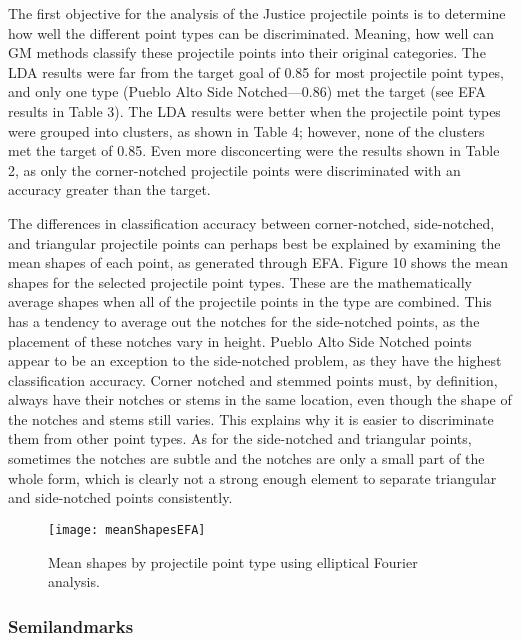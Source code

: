 \documentclass[PCJ,Unicode,screen,mode=plain]{cedram}
\begin{document}
The first objective for the analysis of the Justice projectile points is to determine how well the different point types can be discriminated. Meaning, how well can GM methods classify these projectile points into their original categories. The LDA results were far from the target goal of 0.85 for most projectile point types, and only one type (Pueblo Alto Side Notched---0.86) met the target (see EFA results in Table 3). The LDA results were better when the projectile point types were grouped into clusters, as shown in Table 4; however, none of the clusters met the target of 0.85. Even more disconcerting were the results shown in Table 2, as only the corner-notched projectile points were discriminated with an accuracy greater than the target.

The differences in classification accuracy between corner-notched, side-notched, and triangular projectile points can perhaps best be explained by examining the mean shapes of each point, as generated through EFA. Figure 10 shows the mean shapes for the selected projectile point types. These are the mathematically average shapes when all of the projectile points in the type are combined. This has a tendency to average out the notches for the side-notched points, as the placement of these notches vary in height. Pueblo Alto Side Notched points appear to be an exception to the side-notched problem, as they have the highest classification accuracy. Corner notched and stemmed points must, by definition, always have their notches or stems in the same location, even though the shape of the notches and stems still varies. This explains why it is easier to discriminate them from other point types. As for the side-notched and triangular points, sometimes the notches are subtle and the notches are only a small part of the whole form, which is clearly not a strong enough element to separate triangular and side-notched points consistently.

\begin{figure}
\texttt{[image: meanShapesEFA]} \caption{Mean shapes by projectile point type using elliptical Fourier analysis.}\label{fig:meanShapes}
\end{figure}

\subsubsection{Semilandmarks}
\end{document}
